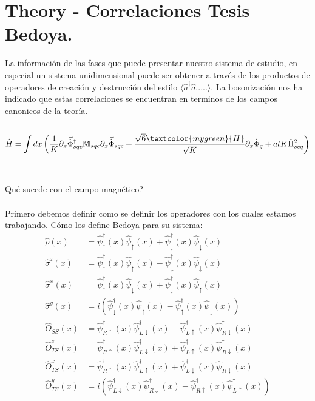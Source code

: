 \section{Theory - Correlaciones Tesis Bedoya.}
La información de las fases que puede presentar nuestro sistema de estudio, en especial un sistema unidimensional puede ser obtener a través de los productos de operadores de creación y destrucción  del estilo $\langle \hat{a}^{\dagger} \hat{a} ..... \rangle$. La bosonización nos ha indicado que estas correlaciones se encuentran en terminos de los campos canonicos de la teoría. \\ \\
\begin{equation}
    \hat{H} = \int  dx \left ( \frac{1}{K} \partial_{x} \vec{\hat{\Phi}}_{sqc}^{\dagger} \mathbb{M}_{sqc} \partial_{x} \vec{\hat{\Phi}}_{sqc}   + \frac{\sqrt{6} \textcolor{mygreen}{H}}{\sqrt{K}} \partial_x \hat{\Phi}_{q} + atK \hat{\Pi}_{scq}^{2} \right)
\end{equation}\\ \\
\textcolor{myred}{Qué sucede con el campo magnético?}\\ \\
Primero debemos definir como se definir los operadores con los cuales estamos trabajando. Cómo los define Bedoya para su sistema:
$$
\begin{aligned}
\hat{\rho}(x) & =\hat{\psi}_{\uparrow}^{\dagger}(x) \hat{\psi}_{\uparrow}(x)+\hat{\psi}_{\downarrow}^{\dagger}(x) \hat{\psi}_{\downarrow}(x) \\
\hat{\sigma}^z(x) & =\hat{\psi}_{\uparrow}^{\dagger}(x) \hat{\psi}_{\uparrow}(x)-\hat{\psi}_{\downarrow}^{\dagger}(x) \hat{\psi}_{\downarrow}(x) \\
\hat{\sigma}^x(x) & =\hat{\psi}_{\uparrow}^{\dagger}(x) \hat{\psi}_{\downarrow}(x)+\hat{\psi}_{\downarrow}^{\dagger}(x) \hat{\psi}_{\uparrow}(x) \\
\hat{\sigma}^y(x) & =i\left(\hat{\psi}_{\downarrow}^{\dagger}(x) \hat{\psi}_{\uparrow}(x)-\hat{\psi}_{\uparrow}^{\dagger}(x) \hat{\psi}_{\downarrow}(x)\right) \\
\hat{O}_{S S}(x) & =\hat{\psi}_{R \uparrow}^{\dagger}(x) \hat{\psi}_{L \downarrow}^{\dagger}(x)-\hat{\psi}_{L \uparrow}^{\dagger}(x) \hat{\psi}_{R \downarrow}^{\dagger}(x) \\
\hat{O}_{T S}^z(x) & =\hat{\psi}_{R \uparrow}^{\dagger}(x) \hat{\psi}_{L \downarrow}^{\dagger}(x)+\hat{\psi}_{L \uparrow}^{\dagger}(x) \hat{\psi}_{R \downarrow}^{\dagger}(x) \\
\hat{O}_{T S}^x(x) & =\hat{\psi}_{R \uparrow}^{\dagger}(x) \hat{\psi}_{L \uparrow}^{\dagger}(x)+\hat{\psi}_{L \downarrow}^{\dagger}(x) \hat{\psi}_{R \downarrow}^{\dagger}(x) \\
\hat{O}_{T S}^y(x) & =i\left(\hat{\psi}_{L \downarrow}^{\dagger}(x) \hat{\psi}_{R \downarrow}^{\dagger}(x)-\hat{\psi}_{R \uparrow}^{\dagger}(x) \hat{\psi}_{L \uparrow}^{\dagger}(x)\right)
\end{aligned}
$$
